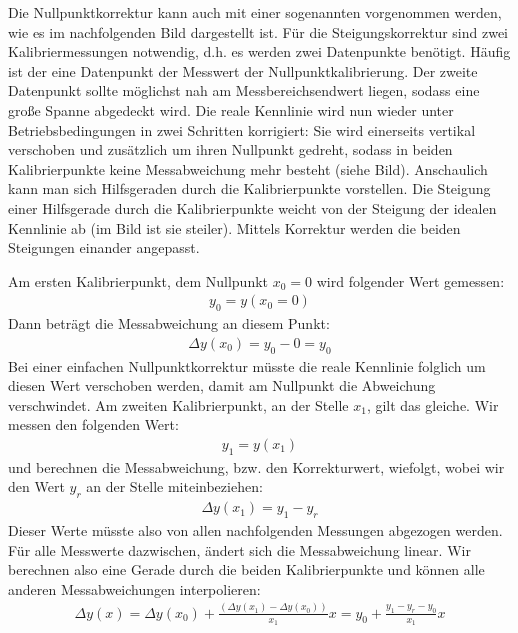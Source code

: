 \documentclass[letterpaper,10pt,english]{jupyterBook}
\begin{document}
\sphinxAtStartPar
Die Nullpunktkorrektur kann auch mit einer sogenannten  vorgenommen werden, wie es im nachfolgenden Bild dargestellt ist. Für die Steigungskorrektur sind zwei Kalibriermessungen notwendig, d.h. es werden zwei Datenpunkte benötigt. Häufig ist der eine Datenpunkt der Messwert der Nullpunktkalibrierung. Der zweite Datenpunkt sollte möglichst nah am Messbereichsendwert liegen, sodass eine große Spanne abgedeckt wird. Die reale Kennlinie wird nun wieder unter Betriebsbedingungen in zwei Schritten korrigiert: Sie wird einerseits vertikal verschoben und zusätzlich um ihren Nullpunkt gedreht, sodass in beiden Kalibrierpunkte keine Messabweichung mehr besteht (siehe Bild).
Anschaulich kann man sich Hilfsgeraden durch die Kalibrierpunkte vorstellen. Die Steigung einer Hilfsgerade durch die Kalibrierpunkte weicht von der Steigung der idealen Kennlinie ab (im Bild ist sie steiler). Mittels Korrektur werden die beiden Steigungen einander angepasst.

\sphinxAtStartPar
Am ersten Kalibrierpunkt, dem Nullpunkt \(x_0 = 0\) wird folgender Wert gemessen:
\begin{equation*}
\begin{split}y_0 = y(x_0 = 0)\end{split}
\end{equation*}
\sphinxAtStartPar
Dann beträgt die Messabweichung an diesem Punkt:
\begin{equation*}
\begin{split}\Delta y(x_0) = y_0 - 0 = y_0\end{split}
\end{equation*}
\sphinxAtStartPar
Bei einer einfachen Nullpunktkorrektur müsste die reale Kennlinie folglich um diesen Wert verschoben werden, damit am Nullpunkt die Abweichung verschwindet. Am zweiten Kalibrierpunkt, an der Stelle \(x_1\), gilt das gleiche. Wir messen den folgenden Wert:
\begin{equation*}
\begin{split}y_1 = y(x_1)\end{split}
\end{equation*}
\sphinxAtStartPar
und berechnen die Messabweichung, bzw. den Korrekturwert, wiefolgt, wobei wir den  Wert \(y_r\) an der Stelle miteinbeziehen:
\begin{equation*}
\begin{split}\Delta y(x_1) = y_1 - y_r\end{split}
\end{equation*}
\sphinxAtStartPar
Dieser Werte müsste also von allen nachfolgenden Messungen abgezogen werden.
Für alle Messwerte dazwischen, ändert sich die Messabweichung linear. Wir berechnen also eine Gerade durch die beiden Kalibrierpunkte und können alle anderen Messabweichungen interpolieren:
\begin{equation*}
\begin{split}\Delta y(x) = \Delta y(x_0) + \frac{(\Delta y(x_1) - \Delta y(x_0))}{x_1} x = y_0 + \frac{y_1 - y_r - y_0}{x_1} x\end{split}
\end{equation*}
\sphinxAtStartPar
{}
\end{document}
